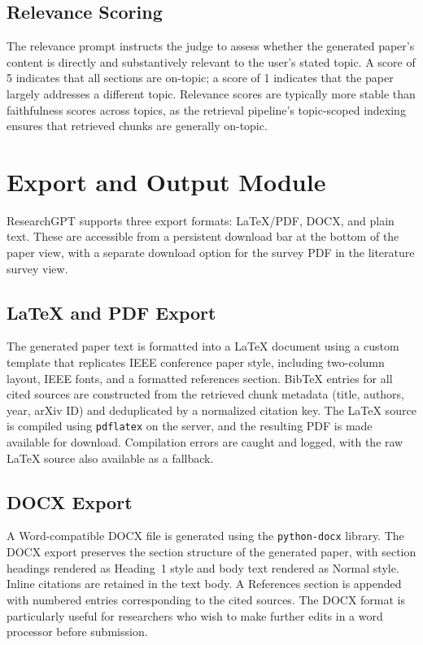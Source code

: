 \documentclass[12pt, a4paper]{article}
\begin{document}
\subsection{Relevance Scoring}

The relevance prompt instructs the judge to assess whether the generated paper's
content is directly and substantively relevant to the user's stated topic. A score
of 5 indicates that all sections are on-topic; a score of 1 indicates that the paper
largely addresses a different topic. Relevance scores are typically more stable than
faithfulness scores across topics, as the retrieval pipeline's topic-scoped indexing
ensures that retrieved chunks are generally on-topic.

\section{Export and Output Module}

ResearchGPT supports three export formats: LaTeX/PDF, DOCX, and plain text. These
are accessible from a persistent download bar at the bottom of the paper view, with
a separate download option for the survey PDF in the literature survey view.

\subsection{LaTeX and PDF Export}

The generated paper text is formatted into a LaTeX document using a custom template
that replicates IEEE conference paper style, including two-column layout, IEEE
fonts, and a formatted references section. BibTeX entries for all cited sources are
constructed from the retrieved chunk metadata (title, authors, year, arXiv ID) and
deduplicated by a normalized citation key. The LaTeX source is compiled using
\texttt{pdflatex} on the server, and the resulting PDF is made available for
download. Compilation errors are caught and logged, with the raw LaTeX source also
available as a fallback.

\subsection{DOCX Export}

A Word-compatible DOCX file is generated using the \texttt{python-docx} library.
The DOCX export preserves the section structure of the generated paper, with
section headings rendered as Heading~1 style and body text rendered as Normal style.
Inline citations are retained in the text body. A References section is appended
with numbered entries corresponding to the cited sources. The DOCX format is
particularly useful for researchers who wish to make further edits in a word
processor before submission.
\end{document}
